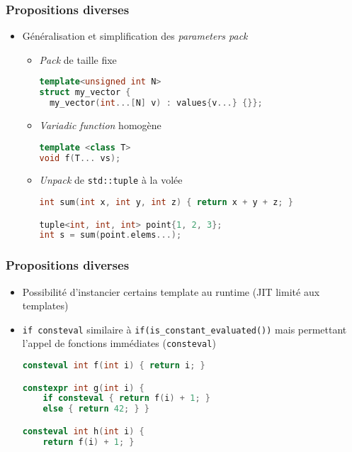 \documentclass[C++.tex]{subfiles}
\begin{document}
\begin{frame}[fragile]
	\frametitle{Propositions diverses}
	\begin{itemize}
		\item Généralisation et simplification des \textit{parameters pack}
		\begin{itemize}
			\item \textit{Pack} de taille fixe

			\begin{lstlisting}[language=C++]
template<unsigned int N>
struct my_vector {
  my_vector(int...[N] v) : values{v...} {}};\end{lstlisting}

			\item \textit{Variadic function} homogène

			\begin{lstlisting}[language=C++]
template <class T>
void f(T... vs);\end{lstlisting}



			\item \og \textit{Unpack}\fg{} de \lstinline|std::tuple| à la volée

			\begin{lstlisting}[language=C++]
int sum(int x, int y, int z) { return x + y + z; }

tuple<int, int, int> point{1, 2, 3};
int s = sum(point.elems...);\end{lstlisting}

		\end{itemize}
	\end{itemize}
\end{frame}

\begin{frame}[fragile]
  \frametitle{Propositions diverses}
  \begin{itemize}
	\item Possibilité d'instancier certains template au runtime (JIT limité aux templates)


	\item \lstinline|if consteval| similaire à \lstinline|if(is_constant_evaluated())| mais permettant l'appel de fonctions immédiates (\lstinline|consteval|)

	\begin{lstlisting}[language=C++]
consteval int f(int i) { return i; }

constexpr int g(int i) {
	if consteval { return f(i) + 1;	} 
	else { return 42; } }

consteval int h(int i) {
	return f(i) + 1; } \end{lstlisting}

	\end{itemize}
\end{frame}
\end{document}
